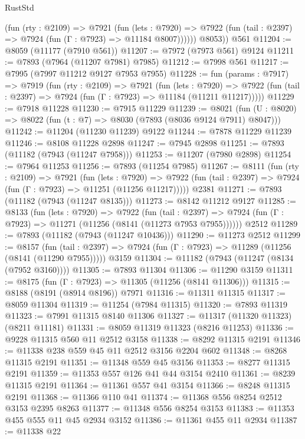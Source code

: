 \begin{lexlean}{RustStd}
\begin{coremodule}
            (fun (rty : @2109) =>
            @7921
              (fun (lets : @7920) =>
              @7922 (fun (tail : @2397) => @7924 (fun (Γ : @7923) => @11184 @8007))))))
        @8053))
    @561
@11204 := @8059 (@11177 (@7910 @561))
@11207 := @7972 (@7973 @561) @9124
@11211 := @7893 (@7964 (@11207 @7981) @7985)
@11212 := @7998 @561
@11217 := @7995 (@7997 @11212 @9127 @7953 @7955)
@11228 := fun (params : @7917) =>
  @7919
    (fun (rty : @2109) =>
    @7921
      (fun (lets : @7920) =>
      @7922 (fun (tail : @2397) => @7924 (fun (Γ : @7923) => @11184 (@11211 @11217)))))
@11229 := @7918 @11228
@11230 := @7915 @11229
@11239 := @8021 (fun (U : @8020) => @8022 (fun (t : @7) => @8030 (@7893 (@8036 @9124 @7911) @8047)))
@11242 := @11204 (@11230 @11239) @9122
@11244 := @7878 @11229 @11239
@11246 := @8108 @11228 @2898
@11247 := @7945 @2898
@11251 := @7893 (@11182 (@7943 (@11247 @7958)))
@11253 := @11207 (@7980 @2898)
@11254 := @7964 @11253
@11256 := @7893 (@11254 @7985)
@11267 := @8111
    (fun (rty : @2109) =>
    @7921
      (fun (lets : @7920) =>
      @7922 (fun (tail : @2397) => @7924 (fun (Γ : @7923) => @11251 (@11256 @11217)))))
    @2381
@11271 := @7893 (@11182 (@7943 (@11247 @8135)))
@11273 := @8142 @11212 @9127
@11285 := @8133
    (fun (lets : @7920) =>
    @7922
      (fun (tail : @2397) =>
      @7924 (fun (Γ : @7923) => @11271 (@11256 (@8141 (@11273 @7953 @7955))))))
    @2512
@11289 := @7893 (@11182 (@7943 (@11247 @10436)))
@11290 := @11273 @2512
@11299 := @8157
    (fun (tail : @2397) => @7924 (fun (Γ : @7923) => @11289 (@11256 (@8141 (@11290 @7955)))))
    @3159
@11304 := @11182 (@7943 (@11247 (@8134 (@7952 @3160))))
@11305 := @7893 @11304
@11306 := @11290 @3159
@11311 := @8175 (fun (Γ : @7923) => @11305 (@11256 (@8141 @11306)))
@11315 := @8188 (@8191 (@8914 @8196)) @7971
@11316 := @11311 @11315
@11317 := @8059 @11304
@11319 := @11254 (@7984 @11315)
@11320 := @7893 @11319
@11323 := @7991 @11315 @8140 @11306
@11327 := @11317 (@11320 @11323) (@8211 @11181)
@11331 := @8059 @11319 @11323 (@8216 @11253)
@11336 := @9228 @11315 @560 @11 @2512 @3158
@11338 := @8292 @11315 @2191
@11346 := @11338 @238 @559 @45 @11 @2512 @3156 @2204 @602
@11348 := @8268 @11315 @2191
@11351 := @11348 @559 @45 @3156
@11353 := @8277 @11315 @2191
@11359 := @11353 @557 @126 @41 @44 @3154 @2410
@11361 := @8239 @11315 @2191
@11364 := @11361 @557 @41 @3154
@11366 := @8248 @11315 @2191
@11368 := @11366 @110 @41
@11374 := @11368 @556 @8254 @2512 @3153 @2395 @8263
@11377 := @11348 @556 @8254 @3153
@11383 := @11353 @455 @555 @11 @45 @2934 @3152
@11386 := @11361 @455 @11 @2934
@11387 := @11338 @22

\end{coremodule}
\end{lexlean}
